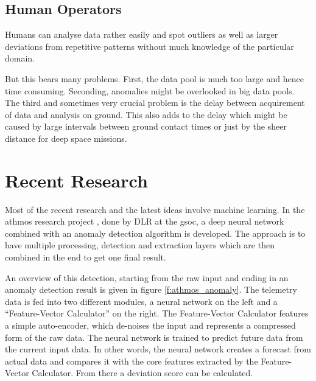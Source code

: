 

\subsection{Human Operators}
Humans can analyse data rather easily and spot outliers as well as larger deviations from repetitive patterns without much knowledge of the particular domain. 

But this bears many problems. First, the data pool is much too large and hence time consuming. Seconding, anomalies might be overlooked in big data pools. The third and sometimes very crucial problem is the delay between acquirement of data and analysis on ground. This also adds to the delay which might be caused by large intervals between ground contact times or just by the sheer distance for deep space missions. %



\section{Recent Research}
Most of the recent research and the latest ideas involve machine learning. In the \ac{athmos} research project \cite{athmos} \cite{athmos-sub}, done by DLR at the \ac{gsoc}, a deep neural network combined with an anomaly detection algorithm is developed. \newline
The approach is to have multiple processing, detection and extraction layers which are then combined in the end to get one final result.

An overview of this detection, starting from the raw input and ending in an anomaly detection result is given in figure \ref{f:athmos_anomaly}. The telemetry data is fed into two different modules, a neural network on the left and a \enquote{Feature-Vector Calculator} on the right. The Feature-Vector Calculator features a simple auto-encoder, which de-noises the input and represents a compressed form of the raw data. The neural network is trained to predict future data from the current input data. In other words, the neural network creates a forecast from actual data and compares it with the core features extracted by the Feature-Vector Calculator. From there a deviation score can be calculated.

